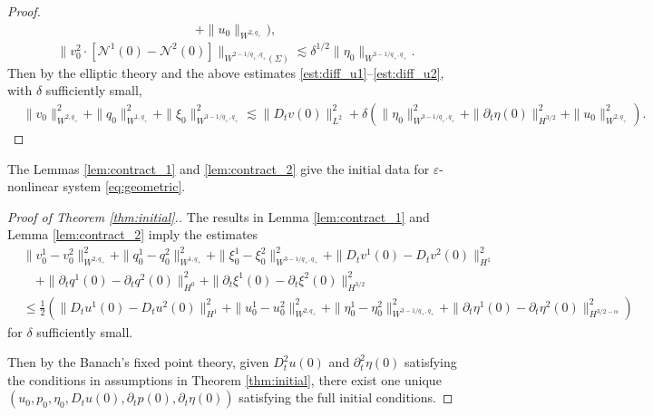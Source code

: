 \documentclass[letterpaper,reqno,10pt,twoside]{amsart}
\theoremstyle{definition}
\theoremstyle{remark}
\def\p{\partial}
\begin{document}
\begin{appendix}
\begin{proof}
\begin{equation}
\begin{aligned}
						+\|u_0\|_{W^{2,q_+}}),
					\end{aligned}
				\end{equation}
				\begin{equation}\label{est:diff_u2}
					\|v_0^2\cdot[\mathcal{N}^1(0)-\mathcal{N}^2(0)]\|_{W^{2-1/q_+, q_+}(\Sigma)}\lesssim\delta^{1/2}\|\eta_0\|_{W^{3-1/q_+,q_+}}.
				\end{equation}
				Then by the elliptic theory and the above estimates \eqref{est:diff_u1}--\eqref{est:diff_u2}, with $\delta$ sufficiently small,
				\[
				\begin{aligned}
					&\|v_0\|_{W^{2,q_+}}^2+\|q_0\|_{W^{1,q_+}}^2+\|\xi_0\|_{W^{3-1/q_+,q_+}}^2\lesssim \|D_tv(0)\|_{L^2}^2+\delta(\|\eta_0\|_{W^{3-1/q_+,q_+}}^2+\|\p_t\eta(0)\|_{H^{3/2}}^2+\|u_0\|_{W^{2,q_+}}^2).
				\end{aligned}
				\]
				
			\end{proof}
			
			The Lemmas \ref{lem:contract_1} and \ref{lem:contract_2} give the initial data for $\varepsilon$- nonlinear system \eqref{eq:geometric}.
			
			\begin{proof}[Proof of Theorem \ref{thm:initial}.]
				The results in Lemma \ref{lem:contract_1} and Lemma \ref{lem:contract_2} imply the estimates
				\[
				\begin{aligned}
					&\|v_0^1-v_0^2\|_{W^{2,q_+}}^2+\|q_0^1-q_0^2\|_{W^{1,q_+}}^2+\|\xi_0^1-\xi_0^2\|_{W^{3-1/q_+,q_+}}^2+\|D_tv^1(0)-D_tv^2(0)\|_{H^1}^2\\
					&\quad+\|\p_tq^1(0)-\p_tq^2(0)\|_{H^0}^2+\|\p_t\xi^1(0)-\p_t\xi^2(0)\|_{H^{3/2}}^2\\
					&\le \frac12(\|D_tu^1(0)-D_tu^2(0)\|_{H^1}^2+\|u_0^1-u_0^2\|_{W^{2,q_+}}^2+\|\eta_0^1-\eta_0^2\|_{W^{3-1/q_+,q_+}}^2+\|\p_t\eta^1(0)-\p_t\eta^2(0)\|_{H^{3/2-\alpha}}^2)
				\end{aligned}
				\]
				for $\delta$ sufficiently small.
				
				Then by the Banach's fixed point theory, given $D_t^2u(0)$ and $\p_t^2\eta(0)$ satisfying the conditions in assumptions in Theorem \ref{thm:initial}, there exist one unique $(u_0, p_0, \eta_0, D_tu(0), \p_tp(0), \p_t\eta(0))$ satisfying the full initial conditions.
			\end{proof}
			

\end{appendix}
\end{document}
